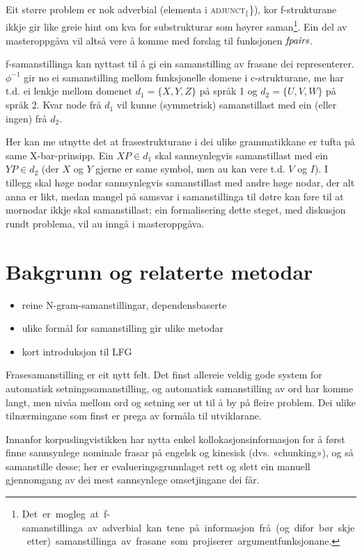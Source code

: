 \documentclass[11pt,a4paper,oneside,draft]{book}
\newcommand{\F}[2]{\textsc{#1}\ensuremath{_{#2}}}
\newcommand{\fpairs}{\ensuremath{\operatorname{\emph{fpairs}}}}
\begin{document}
Eit større problem er nok adverbial (elementa i \F{adjunct}\{\}), kor
f-strukturane ikkje gir like greie hint om kva for substrukturar som
høyrer
saman\footnote{Det~er~mogleg~at~f-samanstillinga~av~adverbial~kan~tene~på~informasjon~frå~(og~difor~bør~skje~etter)~samanstillinga~av~frasane~som~projiserer~argumentfunksjonane.}. Ein
del av masteroppgåva vil altså vere å komme med forslag til funksjonen
\fpairs{}.


f-samanstillinga kan nyttast til å gi ein samanstilling av frasane dei
representerer. $\phi^{-1}$ gir no ei samanstilling mellom funksjonelle
domene i c-strukturane, me har t.d. ei lenkje mellom domenet
$d_{1}=\{X, Y, Z\}$ på språk 1 og $d_{2}=\{U, V, W\}$ på språk 2. Kvar
node frå $d_{1}$ vil kunne (symmetrisk) samanstillast med ein (eller
ingen) frå $d_{2}$.

Her kan me utnytte det at frasestrukturane i dei ulike grammatikkane
er tufta på same X-bar-prinsipp. Ein $XP\in d_{1}$ skal sannsynlegvis
samanstillast med ein $YP\in d_{2}$ (der $X$ og $Y$ gjerne er same
symbol, men au kan vere t.d. $V$ og $I$). I tillegg skal høge nodar
sannsynlegvis samanstillast med andre høge nodar, der alt anna er
likt, medan mangel på samsvar i samanstillinga til døtre kan føre til
at mornodar ikkje skal samanstillast; ein formalisering dette steget,
med diskusjon rundt problema, vil au inngå i masteroppgåva.

\chapter{Bakgrunn og relaterte metodar}
\label{sec-2}

  \label{SEC:bakgrunn}
\begin{itemize}
\item reine N-gram-samanstillingar, dependensbaserte
\item ulike formål for samanstilling gir ulike metodar
\item kort introduksjon til LFG
\end{itemize}
Frasesamanstilling er eit nytt felt. Det finst allereie veldig gode
system for automatisk setningssamanstilling, og automatisk
samanstilling av ord har komme langt, men nivåa mellom ord og setning
ser ut til å by på fleire problem. Dei ulike tilnærmingane som finst
er prega av formåla til utviklarane.

Innanfor korpuslingvistikken har \citet{piao2001mwu} nytta enkel
kollokasjonsinformasjon for å først finne sannsynlege nominale frasar
på engelsk og kinesisk (dvs. «chunking»), og så samanstille desse; her
er evalueringsgrunnlaget rett og slett ein manuell gjennomgang av dei
mest sannsynlege omsetjingane dei får. 
\end{document}
